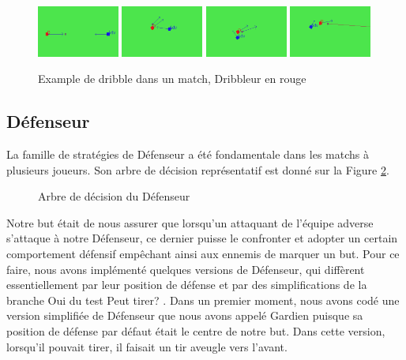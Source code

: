 \documentclass[a4paper,12pt]{article}
\numberwithin{equation}{section}
\begin{document}
\begin{figure}[ht]
\centering
\includegraphics[width = 0.24\textwidth]{dribble1_coupe}
\includegraphics[width = 0.24\textwidth]{dribble2_coupe}
\includegraphics[width = 0.24\textwidth]{dribble3_coupe}
\includegraphics[width = 0.24\textwidth]{dribble4_coupe}
\caption{Example de dribble dans un match, Dribbleur en rouge}
\label{Figure5}
\end{figure}

\subsection{Défenseur}

La famille de stratégies de Défenseur a été fondamentale dans les matchs à plusieurs joueurs. Son arbre de décision représentatif est donné sur la Figure \ref{Figure6}. 

\begin{figure}[ht]
\centering

\caption{Arbre de décision du Défenseur}
\label{Figure6}
\end{figure}

Notre but était de nous assurer que lorsqu’un attaquant de l’équipe adverse s’attaque à notre Défenseur, ce dernier puisse le confronter et adopter un certain comportement défensif empêchant ainsi aux ennemis de marquer un but. Pour ce faire, nous avons implémenté quelques versions de Défenseur, qui diffèrent essentiellement par leur position de défense et par des simplifications de la branche \og Oui \fg{} du test \og Peut tirer? \fg. Dans un premier moment, nous avons codé une version simplifiée de Défenseur que nous avons appelé Gardien puisque sa position de défense par défaut était le centre de notre but. Dans cette version, lorsqu'il pouvait tirer, il faisait un tir aveugle vers l'avant.
\end{document}
